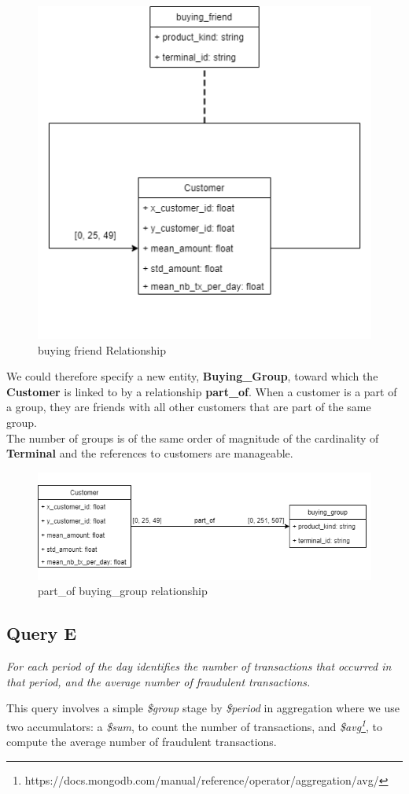\documentclass[runningheads]{llncs}
\begin{document}
\begin{figure}[!htb] 
        \centering \includegraphics[width=0.5\columnwidth]{images/buyingFriends_base.png}
        \caption{\label{b_f_base}buying friend Relationship}
\end{figure}
We could therefore specify a new entity, \textbf{Buying\_Group}, toward which the \textbf{Customer} is linked to by a relationship \textbf{part\_of}. When a customer is a part of a group, they are friends with all other customers that are part of the same group.\\
The number of groups is of the same order of magnitude of the cardinality of \textbf{Terminal} and the references to customers are manageable.
\begin{figure}[!htb] 
        \centering \includegraphics[width=0.8\columnwidth]{images/buyingFriends_group.png}
        \caption{\label{b_group}part\_of buying\_group relationship}
\end{figure}

\subsection{Query E}
\emph{For each period of the day identifies the number of transactions that occurred in that period, and the average number of fraudulent transactions.}

\hfill

\noindent
This query involves a simple \emph{\$group} stage by \emph{\$period} in aggregation where we use two accumulators: a \emph{\$sum}, to count the number of transactions, and \emph{\$avg\footnote{https://docs.mongodb.com/manual/reference/operator/aggregation/avg/}}, to compute the average number of fraudulent transactions.
\end{document}
